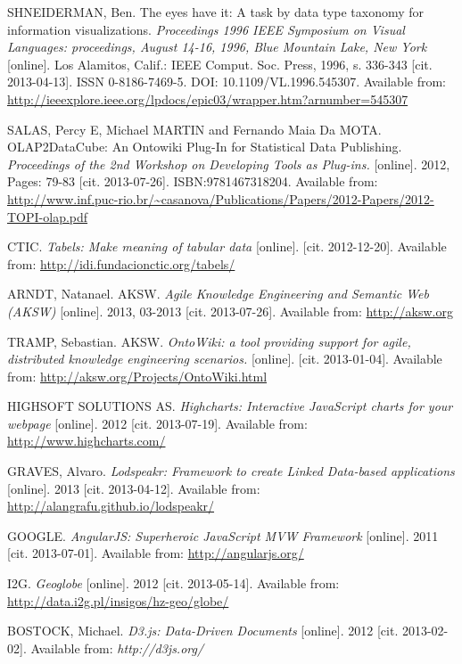 \begin{thebibliography}{99}
 {\sc SHNEIDERMAN,} Ben.
 The eyes have it: A task by data type taxonomy for information visualizations.
 \emph{Proceedings 1996 IEEE Symposium on Visual Languages: proceedings,
 August 14-16, 1996, Blue Mountain Lake, New York}
 [online]. Los Alamitos, Calif.: IEEE Comput. Soc. Press, 1996, s. 336-343
 [cit. 2013-04-13]. ISSN 0-8186-7469-5. DOI: 10.1109/VL.1996.545307.
 Available from: \url{http://ieeexplore.ieee.org/lpdocs/epic03/wrapper.htm?arnumber=545307}

{\sc SALAS,} Percy E, Michael MARTIN and Fernando Maia Da MOTA.
OLAP2DataCube: An Ontowiki Plug-In for Statistical Data Publishing.
\emph{Proceedings of the 2nd Workshop on Developing Tools as Plug-ins.} 
[online]. 2012, Pages: 79-83 [cit. 2013-07-26]. ISBN:9781467318204.
Available from: \url{http://www.inf.puc-rio.br/~casanova/Publications/Papers/2012-Papers/2012-TOPI-olap.pdf}

{\sc CTIC.}
\emph{Tabels: Make meaning of tabular data} [online]. [cit. 2012-12-20].
Available from: \url{http://idi.fundacionctic.org/tabels/}

{\sc ARNDT, Natanael.} AKSW. 
\emph{Agile Knowledge Engineering and Semantic Web (AKSW)} [online].
2013, 03-2013 [cit. 2013-07-26].
Available from: \url{http://aksw.org}

{\sc TRAMP,} Sebastian. AKSW.
\emph{OntoWiki: a tool providing support for agile, distributed knowledge engineering scenarios.}
[online]. [cit. 2013-01-04]. 
Available from: \url{http://aksw.org/Projects/OntoWiki.html}

{\sc HIGHSOFT SOLUTIONS AS.}
\emph{Highcharts: Interactive JavaScript charts for your webpage} [online]. 2012
[cit. 2013-07-19]. 
Available from: \url{http://www.highcharts.com/}

{\sc GRAVES,} Alvaro. 
\emph{Lodspeakr: Framework to create Linked Data-based applications} [online].
2013 [cit. 2013-04-12]. 
Available from: \url{http://alangrafu.github.io/lodspeakr/}

{\sc GOOGLE.}
\emph{AngularJS: Superheroic JavaScript MVW Framework} [online]. 2011
[cit. 2013-07-01]. Available from: \url{http://angularjs.org/}

{\sc I2G.}
\emph{Geoglobe} [online]. 2012 [cit. 2013-05-14].
Available from: \url{http://data.i2g.pl/insigos/hz-geo/globe/}

{\sc BOSTOCK}, Michael. 
\emph{D3.js: Data-Driven Documents} [online]. 2012 [cit. 2013-02-02].
Available from: \emph{http://d3js.org/}


\end{thebibliography}
